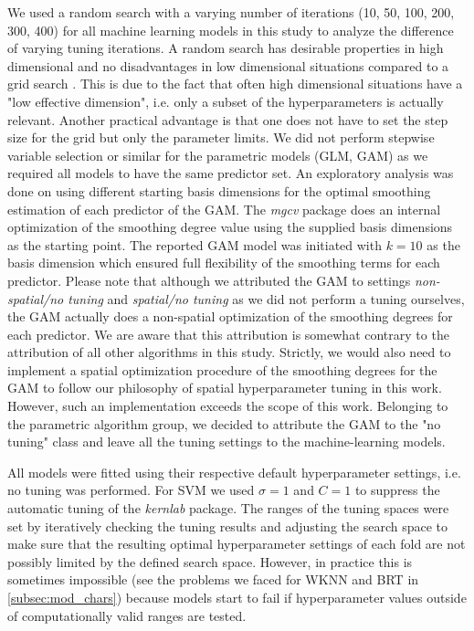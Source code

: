 \documentclass[review]{elsarticle}
\begin{document}
We used a random search with a varying number of iterations (10, 50, 100, 200, 300, 400) for all machine learning models in this study to analyze the difference of varying tuning iterations.
A random search has desirable properties in high dimensional and no disadvantages in low dimensional situations compared to a grid search \citep{Bergstra2012}.
This is due to the fact that often high dimensional situations have a "low effective dimension", i.e. only a subset of the hyperparameters is actually relevant.
Another practical advantage is that one does not have to set the step size for the grid but only the parameter limits.
We did not perform stepwise variable selection or similar for the parametric models (\ac{GLM}, \ac{GAM}) as we required all models to have the same predictor set.
An exploratory analysis was done on using different starting basis dimensions for the optimal smoothing estimation of each predictor of the GAM.
The \textit{mgcv} package does an internal optimization of the smoothing degree value using the supplied basis dimensions as the starting point.
The reported \ac{GAM} model was initiated with $k = 10$ as the basis dimension which ensured full flexibility of the smoothing terms for each predictor.
Please note that although we attributed the GAM to settings \textit{non-spatial/no tuning} and \textit{spatial/no tuning} as we did not perform a tuning ourselves, the GAM actually does a non-spatial optimization of the smoothing degrees for each predictor.
We are aware that this attribution is somewhat contrary to the attribution of all other algorithms in this study.
Strictly, we would also need to implement a spatial optimization procedure of the smoothing degrees for the GAM to follow our philosophy of spatial hyperparameter tuning in this work.
However, such an implementation exceeds the scope of this work.
Belonging to the parametric algorithm group, we decided to attribute the GAM to the "no tuning" class and leave all the tuning settings to the machine-learning models.

All models were fitted using their respective default hyperparameter settings, i.e. no tuning was performed.
For SVM we used $\sigma = 1$ and $C = 1$ to suppress the automatic tuning of the \emph{kernlab} package.
The ranges of the tuning spaces were set by iteratively checking the tuning results and adjusting the search space to make sure that the resulting optimal hyperparameter settings of each fold are not possibly limited by the defined search space.
However, in practice this is sometimes impossible (see the problems we faced for \ac{WKNN} and \ac{BRT} in \autoref{subsec:mod_chars}) because models start to fail if hyperparameter values outside of computationally valid ranges are tested.
\end{document}
